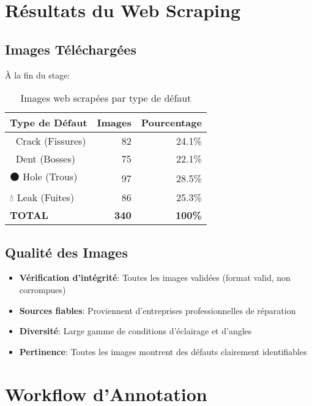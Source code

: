 \documentclass[a4paper,12pt]{report}
\begin{document}
\section{Résultats du Web Scraping}

\subsection{Images Téléchargées}

À la fin du stage:

\begin{table}[H]
    \centering
    \begin{tabular}{|l|r|r|}
    \hline
    \textbf{Type de Défaut} & \textbf{Images} & \textbf{Pourcentage} \\
    \hline
    🔨 Crack (Fissures) & 82 & 24.1\% \\
    \hline
    🚗 Dent (Bosses) & 75 & 22.1\% \\
    \hline
    ⚫ Hole (Trous) & 97 & 28.5\% \\
    \hline
    💧 Leak (Fuites) & 86 & 25.3\% \\
    \hline
    \textbf{TOTAL} & \textbf{340} & \textbf{100\%} \\
    \hline
    \end{tabular}
    \caption{Images web scrapées par type de défaut}
\end{table}

\subsection{Qualité des Images}

\begin{itemize}
    \item \textbf{Vérification d'intégrité}: Toutes les images validées (format valid, non corrompues)
    \item \textbf{Sources fiables}: Proviennent d'entreprises professionnelles de réparation
    \item \textbf{Diversité}: Large gamme de conditions d'éclairage et d'angles
    \item \textbf{Pertinence}: Toutes les images montrent des défauts clairement identifiables
\end{itemize}

\section{Workflow d'Annotation}
\end{document}
